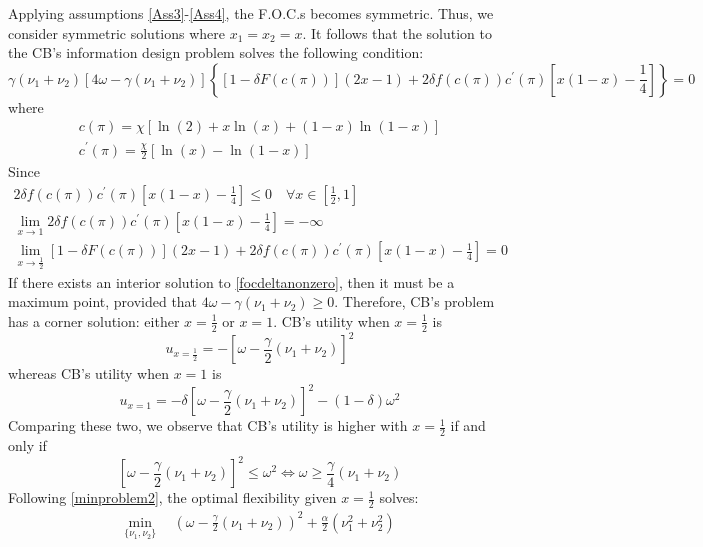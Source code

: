 \documentclass[12pt,a4paper]{article}
\begin{document}
Applying assumptions \ref{Ass3}-\ref{Ass4}, the F.O.C.s becomes symmetric. Thus, we consider symmetric solutions where $x_1=x_2=x$.
It follows that the solution to the CB's information design problem solves the following condition:
    \begin{equation}
    \label{focdeltanonzero}
        \gamma(\nu_1+\nu_2)[4\omega-\gamma(\nu_1+\nu_2)]\left\{[1-\delta F(c(\pi))](2x-1)+2\delta f(c(\pi))c^\prime(\pi)\left[x(1-x)-\frac{1}{4}\right]\right\}=0
    \end{equation}
    where
    \begin{eqnarray}
        c(\pi)=\chi \left[\ln(2)+x\ln(x)+(1-x)\ln(1-x)\right] \\
        c^\prime(\pi)=\frac{\chi}{2}\left[\ln\left(x\right)-\ln(1-x)\right]
    \end{eqnarray}
    Since
    \begin{eqnarray}
        2\delta f(c(\pi))c^\prime(\pi)\left[x(1-x)-\frac{1}{4}\right]\leq 0 \quad \forall x\in\left[\frac{1}{2},1\right] \\
        \lim_{x\to 1}2\delta f(c(\pi))c^\prime(\pi)\left[x(1-x)-\frac{1}{4}\right]=-\infty \\
        \lim_{x\to\frac{1}{2}}[1-\delta F(c(\pi))](2x-1)+2\delta f(c(\pi))c^\prime(\pi)\left[x(1-x)-\frac{1}{4}\right]=0
    \end{eqnarray}
    If there exists an interior solution to \eqref{focdeltanonzero}, then it must be a maximum point, provided that $4\omega-\gamma(\nu_1+\nu_2)\geq0$. Therefore, CB's problem has a corner solution: either $x=\frac{1}{2}$ or $x=1$. CB's utility when $x=\frac{1}{2}$ is
    \begin{equation}
        u_{x=\frac{1}{2}}=-\left[\omega-\frac{\gamma}{2}(\nu_1+\nu_2)\right]^2
    \end{equation}
    whereas CB's utility when $x=1$ is
    \begin{equation}
        u_{x=1}=-\delta\left[\omega-\frac{\gamma}{2}(\nu_1+\nu_2)\right]^2-(1-\delta)\omega^2
    \end{equation}
Comparing these two, we observe that CB's utility is higher with $x=\frac{1}{2}$ if and only if
\begin{equation}
\label{constraintomega}
    \left[\omega-\frac{\gamma}{2}(\nu_1+\nu_2)\right]^2\leq \omega^2 \iff \omega\geq \frac{\gamma}{4}(\nu_1+\nu_2)
\end{equation}
Following \eqref{minproblem2}, the optimal flexibility given $x=\frac{1}{2}$ solves:
\begin{equation}
    \begin{split}
    \min_{\{\nu_1,\nu_2\}} \ & \ \left(\omega-\frac{\gamma}{2}(\nu_1+\nu_2)\right)^2
    +\frac{\alpha}{2}(\nu_1^2+\nu_2^2)
    \end{split}
\end{equation}
\end{document}
